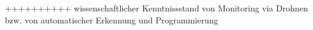 

%
%


++++++++++ wissenschaftlicher Kenntnissstand von Monitoring via Drohnen bzw. von automatischer Erkennung und Programmierung 
